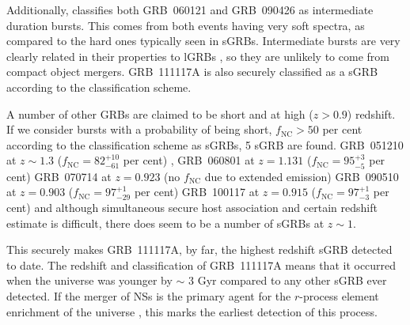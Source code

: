 \documentclass{aa}    %
\begin{document}
Additionally, \citet{Horvath2010} classifies both GRB~060121 and GRB~090426 as
intermediate duration bursts. This comes from both events having very soft
spectra, as compared to the hard ones typically seen in sGRBs. Intermediate
bursts are very clearly related in their properties to lGRBs
\citep{DeUgartePostigo2011}, so they are unlikely to come from compact object
mergers. GRB~111117A is also securely classified as a sGRB according to the
\citet{Horvath2010} classification scheme.

A number of other GRBs are claimed to be short and at high ($z > 0.9$) redshift.
If we consider bursts with a probability of being short, $f_{\mathrm{NC}} > 50$ per cent according to the
\citet{Bromberg2013} classification scheme as sGRBs, 5 sGRB are found.
GRB~051210 at $z \sim 1.3$ ($f_{\mathrm{NC}} = 82_{-61}^{+10}$ per cent)
\cite{Leibler2010},
GRB~060801 at $z = 1.131$ ($f_{\mathrm{NC}} = 95_{-5}^{+3}$ per cent)
\cite{Berger2007}
GRB~070714 at $z = 0.923$ (no $f_{\mathrm{NC}}$ due to extended emission)
\cite{Graham2009}
GRB~090510 at $z = 0.903$ ($f_{\mathrm{NC}} = 97_{-29}^{+1}$ per cent)
\cite{McBreen2010}
GRB~100117 at $z = 0.915$ ($f_{\mathrm{NC}} = 97_{-3}^{+1}$ per cent)
\cite{Fong2011} and although simultaneous secure host association and certain
redshift estimate is difficult, there does seem to be a number of sGRBs at $z
\sim 1$.

This securely makes GRB~111117A, by far, the highest redshift sGRB detected to
date. The redshift and classification of GRB~111117A means that it occurred when
the universe was younger by $\sim$ 3 Gyr compared to any other sGRB ever
detected. If the merger of NSs is the primary agent for the $r$-process element
enrichment of the universe \citep{Goriely2011, Ji2016, Komiya2016}, this marks
the earliest detection of this process.
\end{document}
